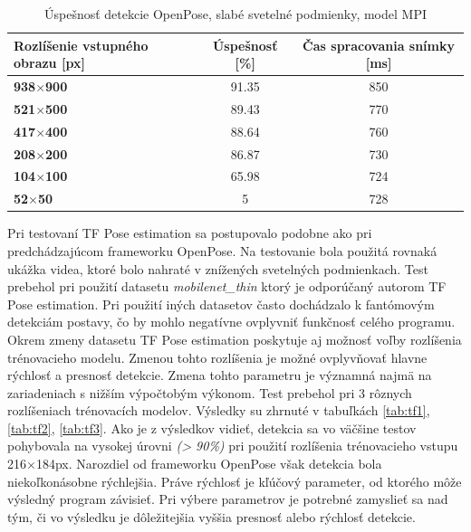 \documentclass[slovak,master,dept460,male,cpp,cpdeclaration]{diploma}
\begin{document}
\begin{table}[H]
\begin{tabular}{|l|c|c|}
\hline
\textbf{Rozlíšenie vstupného obrazu [px]}        & \textbf{Úspešnosť [\%]}  & \textbf{Čas spracovania snímky [ms]} \\ \hline
\textbf{938$\times$900}      &   91.35         &   850        \\ \hline
\textbf{521$\times$500}      &   89.43         &   770        \\ \hline
\textbf{417$\times$400}      &   88.64         &   760        \\ \hline
\textbf{208$\times$200}      &   86.87         &   730        \\ \hline
\textbf{104$\times$100}      &   65.98         &   724        \\ \hline
\textbf{52$\times$50}       &   5             &   728        \\ \hline
\end{tabular}

	\caption{Úspešnosť detekcie OpenPose, slabé svetelné podmienky, model MPI }
	\label{tab:openpose2}
\end{table}


Pri testovaní TF Pose estimation  sa postupovalo podobne ako pri predchádzajúcom frameworku OpenPose. Na testovanie bola použitá rovnaká ukážka videa, ktoré bolo nahraté v znížených svetelných podmienkach. Test prebehol pri použití datasetu \textit{mobilenet\_thin} ktorý je odporúčaný autorom TF Pose estimation. Pri použití iných datasetov často dochádzalo k fantómovým detekciám postavy, čo by mohlo negatívne ovplyvniť funkčnosť celého programu. Okrem zmeny datasetu  TF Pose estimation poskytuje aj možnosť voľby rozlíšenia  trénovacieho modelu. Zmenou tohto rozlíšenia je možné ovplyvňovať hlavne rýchlosť a presnosť detekcie. Zmena tohto parametru je významná najmä na zariadeniach s  nižším výpočtobým výkonom. Test prebehol pri 3 rôznych rozlíšeniach trénovacích modelov. Výsledky su zhrnuté v tabuľkách \ref{tab:tf1}, \ref{tab:tf2}, \ref{tab:tf3}. Ako je z výsledkov vidieť, detekcia  sa vo väčšine testov pohybovala na vysokej úrovni \textit{(> 90\%)} pri použití  rozlíšenia trénovacieho vstupu  216$\times$184px.  Narozdiel od frameworku OpenPose však detekcia bola niekoľkonásobne rýchlejšia. Práve rýchlosť je kľúčový parameter,  od ktorého môže výsledný program závisieť. Pri výbere  parametrov je potrebné zamyslieť sa nad tým, či vo výsledku je dôležitejšia vyššia presnosť alebo rýchlosť detekcie.
\end{document}
